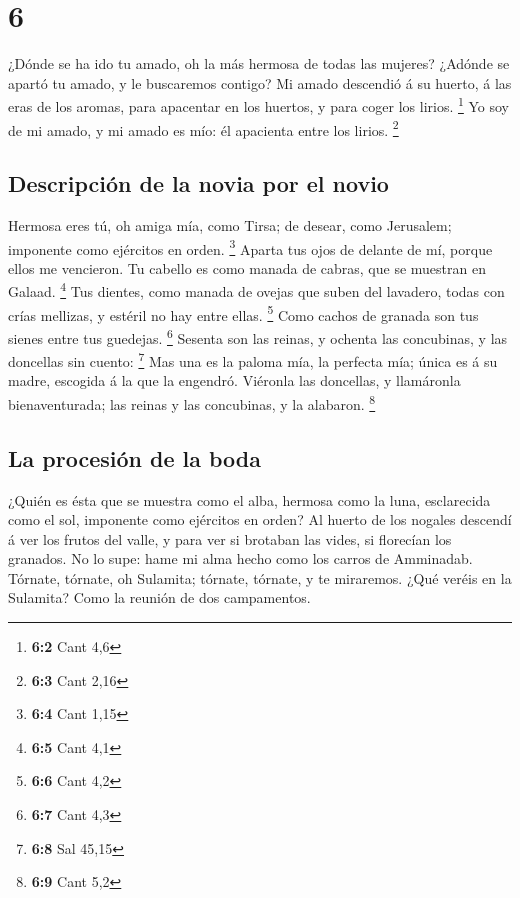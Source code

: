 \hypertarget{section-5}{%
\section{6}\label{section-5}}

 ¿Dónde se ha ido tu amado, oh la más hermosa de todas las
mujeres? ¿Adónde se apartó tu amado, y le buscaremos contigo?
 Mi amado descendió á su huerto, á las eras de los aromas,
para apacentar en los huertos, y para coger los lirios. \footnote{\textbf{6:2}
  Cant 4,6}  Yo soy de mi amado, y mi amado es mío: él
apacienta entre los lirios. \footnote{\textbf{6:3} Cant 2,16}

\hypertarget{descripciuxf3n-de-la-novia-por-el-novio-1}{%
\subsection{Descripción de la novia por el
novio}\label{descripciuxf3n-de-la-novia-por-el-novio-1}}

 Hermosa eres tú, oh amiga mía, como Tirsa; de desear,
como Jerusalem; imponente como ejércitos en orden. \footnote{\textbf{6:4}
  Cant 1,15}  Aparta tus ojos de delante de mí, porque
ellos me vencieron. Tu cabello es como manada de cabras, que se muestran
en Galaad. \footnote{\textbf{6:5} Cant 4,1}  Tus dientes,
como manada de ovejas que suben del lavadero, todas con crías mellizas,
y estéril no hay entre ellas. \footnote{\textbf{6:6} Cant 4,2}
 Como cachos de granada son tus sienes entre tus guedejas.
\footnote{\textbf{6:7} Cant 4,3}  Sesenta son las reinas,
y ochenta las concubinas, y las doncellas sin cuento: \footnote{\textbf{6:8}
  Sal 45,15}  Mas una es la paloma mía, la perfecta mía;
única es á su madre, escogida á la que la engendró. Viéronla las
doncellas, y llamáronla bienaventurada; las reinas y las concubinas, y
la alabaron. \footnote{\textbf{6:9} Cant 5,2}

\hypertarget{la-procesiuxf3n-de-la-boda}{%
\subsection{La procesión de la boda}\label{la-procesiuxf3n-de-la-boda}}

 ¿Quién es ésta que se muestra como el alba, hermosa como
la luna, esclarecida como el sol, imponente como ejércitos en orden?
 Al huerto de los nogales descendí á ver los frutos del
valle, y para ver si brotaban las vides, si florecían los granados.
 No lo supe: hame mi alma hecho como los carros de
Amminadab.  Tórnate, tórnate, oh Sulamita; tórnate,
tórnate, y te miraremos. ¿Qué veréis en la Sulamita? Como la reunión de
dos campamentos.

